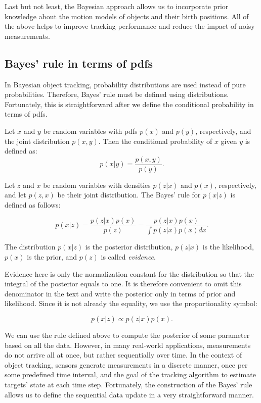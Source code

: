 Last but not least, the Bayesian approach allows us to incorporate prior 
knowledge about the motion models of objects and their birth positions. All of 
the above helps to improve tracking performance and reduce the impact of noisy 
measurements.

\subsection{Bayes' rule in terms of pdfs}

In Bayesian object tracking, probability distributions are used instead of pure 
probabilities. Therefore, Bayes' rule must be defined using distributions. 
Fortunately, this is straightforward after we define the conditional probability in terms of pdfs.

\begin{definition}\label{def:cond-prob-pdf}
    Let $x$ and $y$ be random variables with pdfs $p(x)$ and $p(y)$, respectively, and the joint distribution $p(x,y)$. Then the conditional probability of $x$ given $y$ is defined as:
    \begin{equation*}
        p(x|y) = \frac{p(x,y)}{p(y)}.
    \end{equation*}
\end{definition}

\begin{definition}
    Let $z$ and $x$ be random variables with densities $p(z | x)$ and $p(x)$, 
    respectively, and let $p(z, x)$ be their joint distribution. The Bayes' rule
    for 
    $p(x | z)$ is defined as follows:

    $$
    p(x | z)
        = \frac{p(z | x) p(x)}{p(z)}
        = \frac{p(z | x) p(x)}{\int p(z | x) p(x) dx}.
    $$
\end{definition}

The distribution $p(x | z)$ is the posterior distribution, $p(z | x)$ is the 
likelihood, $p(x)$ is the prior, and $p(z)$ is called \textit{evidence}.

Evidence here is only the normalization constant for the distribution so
that the integral of the posterior equals to one. It is therefore convenient
to omit this denominator in the text and write the posterior only in terms of
prior and likelihood. Since it is not already the equality, we use the
proportionality symbol:

$$
p(x | z) \propto p(z | x) p(x).
$$

We can use the rule defined above to compute the posterior of some parameter
based on all the data. However, in many real-world applications, measurements
do not arrive all at once, but rather sequentially over time. In the context of 
object tracking, sensors generate measurements in a discrete manner, once per
some predefined time interval, and the goal of the tracking algorithm to 
estimate targets' state at each time step. Fortunately, the construction of the
Bayes' rule allows us to define the sequential data update in a very 
straightforward manner.


